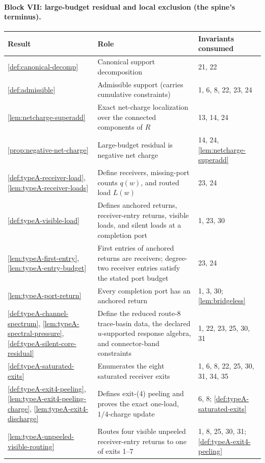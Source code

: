 \documentclass[11pt]{article}
\begin{document}
\paragraph{Block VII: large-budget residual and local exclusion (the spine's terminus).}
{\small
\begin{longtable}{L{0.31\textwidth} L{0.42\textwidth} L{0.17\textwidth}}
\toprule
\textbf{Result} & \textbf{Role} & \textbf{Invariants consumed} \\
\midrule
\endhead
\cref{def:canonical-decomp} & Canonical support decomposition & 21, 22 \\
\cref{def:admissible} & Admissible support (carries cumulative constraints) & 1, 6, 8, 22, 23, 24 \\
\cref{lem:netcharge-superadd} & Exact net-charge localization over the connected components of $R$ & 13, 14, 24 \\
\cref{prop:negative-net-charge} & Large-budget residual is negative net charge & 14, 24, \cref{lem:netcharge-superadd} \\
\cref{def:typeA-receiver-load}, \cref{lem:typeA-receiver-loads} & Define receivers, missing-port counts $q(w)$, and routed load $L(w)$ & 23, 24 \\
\cref{def:typeA-visible-load} & Defines anchored returns, receiver-entry returns, visible loads, and silent loads at a completion port & 1, 23, 30 \\
\cref{lem:typeA-first-entry}, \cref{lem:typeA-entry-budget} & First entries of anchored returns are receivers; degree-two receiver entries satisfy the stated port budget & 23, 24 \\
\cref{lem:typeA-port-return} & Every completion port has an anchored return & 1, 3, 30; \cref{lem:bridgeless} \\
\cref{def:typeA-channel-spectrum}, \cref{lem:typeA-spectral-pressure}, \cref{def:typeA-silent-core-residual} & Define the reduced route-8 trace-basin data, the declared $u$-supported response algebra, and connector-band constraints & 1, 22, 23, 25, 30, 31 \\
\cref{def:typeA-saturated-exits} & Enumerates the eight saturated receiver exits & 1, 6, 8, 22, 25, 30, 31, 34, 35 \\
\cref{def:typeA-exit4-peeling}, \cref{lem:typeA-exit4-peeling-charge}, \cref{lem:typeA-exit4-discharge} & Defines exit-(4) peeling and proves the exact one-load, \(1/4\)-charge update & 6, 8; \cref{def:typeA-saturated-exits} \\
\cref{lem:typeA-unpeeled-visible-routing} & Routes four visible unpeeled receiver-entry returns to one of exits 1--7 & 1, 8, 25, 30, 31; \cref{def:typeA-exit4-peeling} \\

\end{longtable}}
\end{document}
